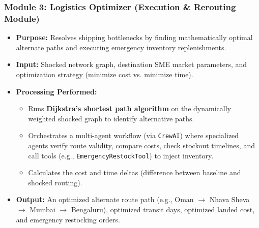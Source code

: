 \subsubsection{Module 3: Logistics Optimizer (Execution \& Rerouting Module)}
\begin{itemize}
    \item \textbf{Purpose:} Resolves shipping bottlenecks by finding mathematically optimal alternate paths and executing emergency inventory replenishments.
    \item \textbf{Input:} Shocked network graph, destination SME market parameters, and optimization strategy (minimize cost vs. minimize time).
    \item \textbf{Processing Performed:}
    \begin{itemize}
        \item Runs \textbf{Dijkstra's shortest path algorithm} on the dynamically weighted shocked graph to identify alternative paths.
        \item Orchestrates a multi-agent workflow (via \texttt{CrewAI}) where specialized agents verify route validity, compare costs, check stockout timelines, and call tools (e.g., \texttt{EmergencyRestockTool}) to inject inventory.
        \item Calculates the cost and time deltas (difference between baseline and shocked routing).
    \end{itemize}
    \item \textbf{Output:} An optimized alternate route path (e.g., Oman $\rightarrow$ Nhava Sheva $\rightarrow$ Mumbai $\rightarrow$ Bengaluru), optimized transit days, optimized landed cost, and emergency restocking orders.
\end{itemize}

